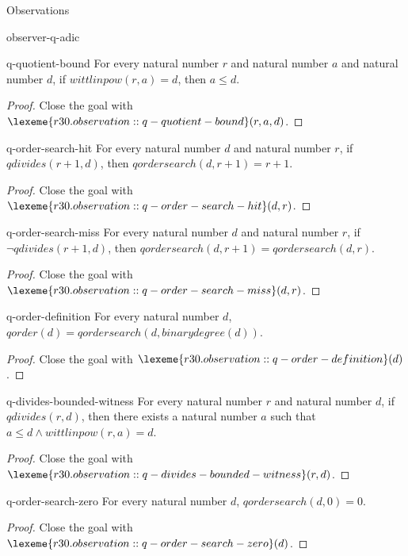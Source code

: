 \begin{lexlean}{Observations}
\begin{section}{observer-q-adic}
\begin{theorem}{q-quotient-bound}
For every natural number \(r\) and natural number \(a\) and natural number \(d\), if \(wittlinpow(r, a) = d\), then \(a ≤ d\).
\begin{proof}
Close the goal with \(\lexeme{r30.observation::q-quotient-bound}(r, a, d)\).
\end{proof}
\end{theorem}

\begin{theorem}{q-order-search-hit}
For every natural number \(d\) and natural number \(r\), if \(qdivides(r + 1, d)\), then \(qordersearch(d, r + 1) = r + 1\).
\begin{proof}
Close the goal with \(\lexeme{r30.observation::q-order-search-hit}(d, r)\).
\end{proof}
\end{theorem}

\begin{theorem}{q-order-search-miss}
For every natural number \(d\) and natural number \(r\), if \(¬ qdivides(r + 1, d)\), then \(qordersearch(d, r + 1) = qordersearch(d, r)\).
\begin{proof}
Close the goal with \(\lexeme{r30.observation::q-order-search-miss}(d, r)\).
\end{proof}
\end{theorem}

\begin{theorem}{q-order-definition}
For every natural number \(d\), \(qorder(d) = qordersearch(d, binarydegree(d))\).
\begin{proof}
Close the goal with \(\lexeme{r30.observation::q-order-definition}(d)\).
\end{proof}
\end{theorem}

\begin{theorem}{q-divides-bounded-witness}
For every natural number \(r\) and natural number \(d\), if \(qdivides(r, d)\), then there exists a natural number \(a\) such that \(a ≤ d ∧ wittlinpow(r, a) = d\).
\begin{proof}
Close the goal with \(\lexeme{r30.observation::q-divides-bounded-witness}(r, d)\).
\end{proof}
\end{theorem}

\begin{theorem}{q-order-search-zero}
For every natural number \(d\), \(qordersearch(d, 0) = 0\).
\begin{proof}
Close the goal with \(\lexeme{r30.observation::q-order-search-zero}(d)\).
\end{proof}
\end{theorem}



\end{section}
\end{lexlean}

